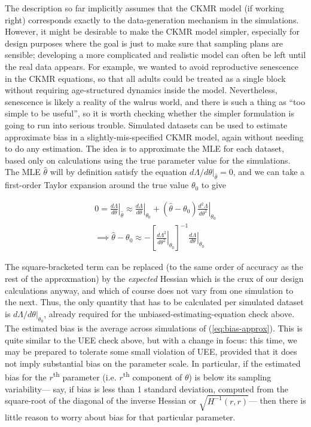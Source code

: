 The description so far implicitly assumes that the CKMR model (if
working right) corresponds exactly to the data-generation mechanism
in the simulations. However, it might be desirable to make the CKMR
model simpler, especially for design purposes where the goal is just
to make sure that sampling plans are sensible; developing a more complicated
and realistic model can often be left until the real data appears.
For example, we wanted to avoid reproductive senescence in the CKMR
equations, so that all adults could be treated as a single block without
requiring age-structured dynamics inside the model. Nevertheless,
senescence is likely a reality of the walrus world, and there is such
a thing as ``too simple to be useful'', so it is worth checking
whether the simpler formulation is going to run into serious trouble.
Simulated datasets can be used to estimate approximate bias in a slightly-mis-specified
CKMR model, again without needing to do any estimation. The idea is
to approximate the MLE for each dataset, based only on calculations
using the true parameter value for the simulations. The MLE $\hat{\theta}$
will by definition satisfy the equation $\left.d\Lambda/d\theta\right\vert _{\hat{\theta}}=0$,
and we can take a first-order Taylor expansion around the true value
$\theta_{0}$ to give

\begin{gather}
0=\left.\frac{d\Lambda}{d\theta}\right\vert _{\hat{\theta}}\approx\left.\frac{d\Lambda}{d\theta}\right\vert _{\theta_{0}}+\left(\hat{\theta}-\theta_{0}\right)\left.\frac{d^{2}\Lambda}{d\theta^{2}}\right\vert _{\theta_{0}}\nonumber \\
\implies\hat{\theta}-\theta_{0}\approx-\left[\left.\frac{d\Lambda^{2}}{d\theta^{2}}\right\vert _{\theta_{0}}\right]^{-1}\left.\frac{d\Lambda}{d\theta}\right\vert _{\theta_{0}}\label{eq:bias-approx}
\end{gather}

The square-bracketed term can be replaced (to the same order of accuracy
as the rest of the approxmation) by the \emph{expected} Hessian which
is the crux of our design calculations anyway, and which of course
does not vary from one simulation to the next. Thus, the only quantity
that has to be calculated per simulated dataset is $\left.d\Lambda/d\theta\right\vert _{\theta_{0}}$,
already required for the unbiased-estimating-equation check above.
The estimated bias is the average across simulations of (\ref{eq:bias-approx}).
This is quite similar to the UEE check above, but with a change in
focus: this time, we may be prepared to tolerate some small violation
of UEE, provided that it does not imply substantial bias on the parameter
scale. In particular, if the estimated bias for the $r$\textsuperscript{th}
parameter (i.e. $r$\textsuperscript{th } component of $\theta$)
is below its sampling variability— say, if bias is less than 1 standard
deviation, computed from the square-root of the diagonal of the inverse
Hessian or $\sqrt{H^{-1}\left(r,r\right)}$— then there is little
reason to worry about bias for that particular parameter. 

